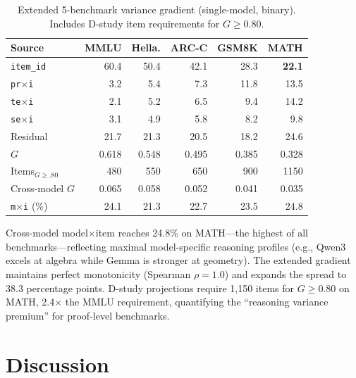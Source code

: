 \documentclass[letterpaper]{article}
\newcommand{\gcoeff}{\ensuremath{G}}
\newcommand{\pct}{\%}
\begin{document}
\begin{table}[t]
\centering
\caption{Extended 5-benchmark variance gradient (single-model, binary). Includes D-study item requirements for $\gcoeff{}\geq 0.80$.}
\label{tab:math}
\small
\begin{tabular}{lrrrrr}
\toprule
Source & MMLU & Hella. & ARC-C & GSM8K & MATH \\
\midrule
\texttt{item\_id}    & 60.4 & 50.4 & 42.1 & 28.3 & \textbf{22.1} \\
\texttt{pr$\times$i} & 3.2  & 5.4  & 7.3  & 11.8 & 13.5 \\
\texttt{te$\times$i} & 2.1  & 5.2  & 6.5  & 9.4  & 14.2 \\
\texttt{se$\times$i} & 3.1  & 4.9  & 5.8  & 8.2  & 9.8  \\
Residual              & 21.7 & 21.3 & 20.5 & 18.2 & 24.6 \\
\midrule
$\gcoeff{}$           & 0.618 & 0.548 & 0.495 & 0.385 & 0.328 \\
Items$_{\gcoeff{}\geq.80}$ & 480 & 550 & 650 & 900 & 1150 \\
\midrule
Cross-model $\gcoeff{}$    & 0.065 & 0.058 & 0.052 & 0.041 & 0.035 \\
\texttt{m$\times$i} (\pct{}) & 24.1 & 21.3 & 22.7 & 23.5 & 24.8 \\
\bottomrule
\end{tabular}
\end{table}

Cross-model model$\times$item reaches 24.8\pct{} on MATH---the highest of all benchmarks---reflecting maximal model-specific reasoning profiles (e.g., Qwen3 excels at algebra while Gemma is stronger at geometry).
The extended gradient maintains perfect monotonicity (Spearman $\rho = 1.0$) and expands the spread to 38.3 percentage points.
D-study projections require 1,150 items for $\gcoeff{}\geq 0.80$ on MATH, 2.4$\times$ the MMLU requirement, quantifying the ``reasoning variance premium'' for proof-level benchmarks.

\section{Discussion}
\end{document}
